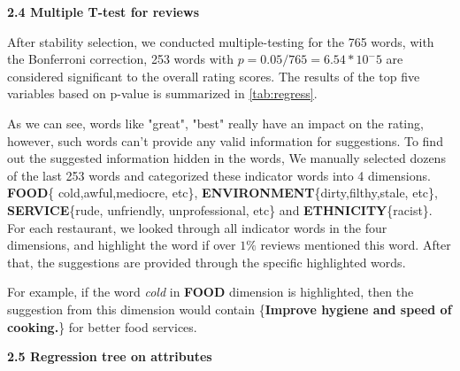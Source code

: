 \documentclass[12pt]{article}
\begin{document}
	
	\noindent\textbf{2.4 Multiple T-test for reviews}
	
	After stability selection, we conducted multiple-testing for the 765 words, with the Bonferroni correction, 253 words with $p = 0.05/765 =6.54*10^-5$ are considered significant to the overall rating scores. The results of the top five variables based on p-value is summarized in \cref{tab:regress}.
	
	\begin{table}[htp]
		\centering
		\caption{T-test Summary (Top 10 variables)}
		\label{tab:regress}
		\label{tab:1}
	\end{table}
	
	As we can see, words like "great", "best" really have an impact on the rating, however, such words can't provide any valid information for suggestions. To find out the suggested information hidden in the words, We manually selected dozens of the last 253 words and categorized these indicator words into 4 dimensions. \textbf{FOOD}\{ cold,awful,mediocre, etc\}, \textbf{ENVIRONMENT}\{dirty,filthy,stale, etc\}, \textbf{SERVICE}\{rude, unfriendly, unprofessional, etc\} and \textbf{ETHNICITY}\{racist\}. For each restaurant, we looked through all indicator words in the four dimensions, and highlight the word if over $1\%$ reviews mentioned this word. After that, the suggestions are provided through the specific highlighted words.
	
	For example, if the word \textit{cold} in \textbf{FOOD} dimension is highlighted, then the suggestion from this dimension would contain \{\textbf{Improve hygiene and speed of cooking.}\} for better food services.
	
	\noindent\textbf{2.5 Regression tree on attributes}
	
\end{document}
